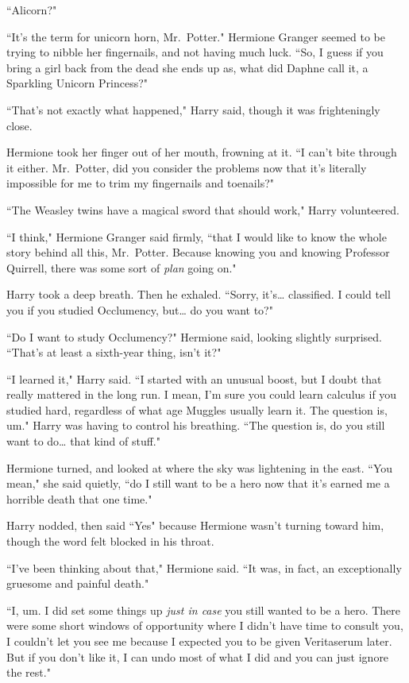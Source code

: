 ``Alicorn?"

``It's the term for unicorn horn, Mr.~Potter." Hermione Granger seemed to be trying to nibble her fingernails, and not having much luck. ``So, I guess if you bring a girl back from the dead she ends up as, what did Daphne call it, a Sparkling Unicorn Princess?"

``That's not exactly what happened," Harry said, though it was frighteningly close.

Hermione took her finger out of her mouth, frowning at it. ``I can't bite through it either. Mr.~Potter, did you consider the problems now that it's literally impossible for me to trim my fingernails and toenails?"

``The Weasley twins have a magical sword that should work," Harry volunteered.

``I think," Hermione Granger said firmly, ``that I would like to know the whole story behind all this, Mr.~Potter. Because knowing you and knowing Professor Quirrell, there was some sort of \emph{plan} going on."

Harry took a deep breath. Then he exhaled. ``Sorry, it's{\ldots} classified. I could tell you if you studied Occlumency, but{\ldots} do you want to?"

``Do I want to study Occlumency?" Hermione said, looking slightly surprised. ``That's at least a sixth-year thing, isn't it?"

``I learned it," Harry said. ``I started with an unusual boost, but I doubt that really mattered in the long run. I mean, I'm sure you could learn calculus if you studied hard, regardless of what age Muggles usually learn it. The question is, um." Harry was having to control his breathing. ``The question is, do you still want to do{\ldots} that kind of stuff."

Hermione turned, and looked at where the sky was lightening in the east. ``You mean," she said quietly, ``do I still want to be a hero now that it's earned me a horrible death that one time."

Harry nodded, then said ``Yes" because Hermione wasn't turning toward him, though the word felt blocked in his throat.

``I've been thinking about that," Hermione said. ``It was, in fact, an exceptionally gruesome and painful death."

``I, um. I did set some things up \emph{just in case} you still wanted to be a hero. There were some short windows of opportunity where I didn't have time to consult you, I couldn't let you see me because I expected you to be given Veritaserum later. But if you don't like it, I can undo most of what I did and you can just ignore the rest."


